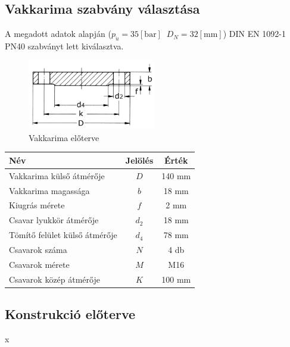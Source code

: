 \documentclass[10pt, a4paper]{article}
\newcommand{\baar}{\mathrm{\left[bar\right]}}
\newcommand{\mm}{\mathrm{\left[mm\right]}}
\begin{document}
	\subsection{Vakkarima szabvány választása}
	A megadott adatok alapján ($p_{\ddot{u}} = 35\baar\;\;D_N = 32\mm$) DIN EN 1092-1 PN40 szabványt lett kiválasztva.
	\begin{figure}[h]
		\centering
		\includegraphics[width=0.5\textwidth]{ vakkarima_eloterv.png }
		\caption{Vakkarima előterve}
		\label{fig:vakkarima}
	\end{figure}
	\renewcommand{\arraystretch}{1.4}
	\begin{table}[h]
		\centering
		\begin{tabular}{l|c|c}
			\textbf{Név}                              & \textbf{Jelölés} & \textbf{Érték} \\ \hline
			Vakkarima külső átmérője                     & $D$                & 140 mm           \\
			Vakkarima magassága                          & $b$                & 18 mm			\\
			Kiugrás mérete                            & $f$                & 2 mm           \\
			Csavar lyukkör átmérője                   & $d_2$             & 18 mm           \\
			Tömítő felület külső átmérője             & $d_4$             & 78 mm           \\
			Csavarok száma                            & $N$                & 4 db           \\
			Csavarok mérete                           & $M$                & M16          \\ 
			Csavarok közép átmérője                   & $K$                & 100 mm             
		\end{tabular}
	\end{table}
	\renewcommand{\arraystretch}{1}
	\subsection{Konstrukció előterve}
	x
\end{document}

